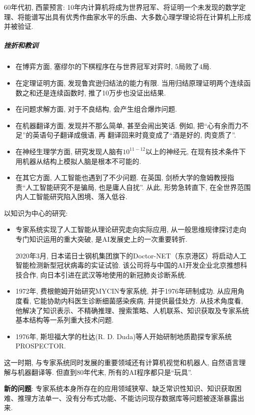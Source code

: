 60年代初, 西蒙预言: 10年内计算机将成为世界冠军、将证明一个未发现的数学定理、将能谱写出具有优秀作曲家水平的乐曲、大多数心理学理论将在计算机上形成并被验证.
\subparagraph{挫折和教训}
\begin{itemize}
\item  在博弈方面, 塞缪尔的下棋程序在与世界冠军对弈时, 5局败了4局.
\item  在定理证明方面, 发现鲁宾逊归结法的能力有限. 当用归结原理证明两个连续函数之和还是连续函数时, 推了10万步也没证出结果.
\item  在问题求解方面, 对于不良结构, 会产生组合爆炸问题.
\item  在机器翻译方面, 发现并不那么简单, 甚至会闹出笑话. 例如, 把“心有余而力不足”的英语句子翻译成俄语, 再 翻译回来时竟变成了“酒是好的, 肉变质了”.
\item  在神经生理学方面, 研究发现人脑有$10^{11-12}$以上的神经元, 在现有技术条件下用机器从结构上模拟人脑是根本不可能的.
\item  在其它方面, 人工智能也遇到了不少问题. 在英国, 剑桥大学的詹姆教授指责“人工智能研究不是骗局, 也是庸人自扰”. 从此, 形势急转直下, 在全世界范围内人工智能研究陷入困境、落入低谷.
\end{itemize}

以知识为中心的研究:
\begin{itemize}
\item  专家系统实现了人工智能从理论研究走向实际应用, 从一般思维规律探讨走向专门知识运用的重大突破, 是AI发展史上的一次重要转折.

2020年3月, 日本诺日士钢机集团旗下的Doctor-NET（东京港区）将启动人工智能检测新型冠状病毒的实证试验. 该公司将与中国的AI开发企业北京推想科技合作, 向日本引进在武汉等地使用的新冠肺炎诊断系统.

\item  1972年, 费根鲍姆开始研究MYCIN专家系统, 并于1976年研制成功. 从应用角度看, 它能协助内科医生诊断细菌感染疾病, 并提供最佳处方. 从技术角度看, 他解决了知识表示、不精确推理、搜索策略、人机联系、知识获取及专家系统基本结构等一系列重大技术问题.
\item  1976年, 斯坦福大学的杜达(R. D. Duda)等人开始研制地质勘探专家系统PROSPECTOR.
\end{itemize}

这一时期, 与专家系统同时发展的重要领域还有计算机视觉和机器人, 自然语言理解与机器翻译等. 但直到80年代末,  所有的AI程序都只是“玩具”.

\textbf{新的问题}: 专家系统本身所存在的应用领域狭窄、缺乏常识性知识、知识获取困难、推理方法单一、没有分布式功能、不能访问现存数据库等问题被逐渐暴露出来.
